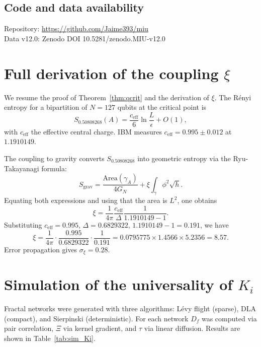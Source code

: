 \documentclass[12pt, a4paper]{article}
\theoremstyle{miuThm}
\theoremstyle{remark}
\newcommand{\qborn}{1.1910149}
\newcommand{\qcrit}{0.50808268}
\begin{document}
\subsection*{Code and data availability}
Repository: \url{https://github.com/Jaime393/miu}\\
Data v12.0: Zenodo DOI 10.5281/zenodo.MIU-v12.0

\appendix
\renewcommand{\thesection}{\AlphAlph{\value{section}}}
\section{Full derivation of the coupling $\xi$}
\label{app:xi_proof}


We resume the proof of Theorem~\ref{thm:qcrit} and the derivation of $\xi$. The Rényi entropy for a bipartition of $N=127$ qubits at the critical point is
\begin{equation}
S_{\qcrit}(A) = \frac{c_{\text{eff}}}{6}\ln\frac{L}{\epsilon} + O(1),
\end{equation}
with $c_{\text{eff}}$ the effective central charge. IBM measures $c_{\text{eff}} = 0.995\pm0.012$ at $\qborn$.

The coupling to gravity converts $S_{\qcrit}$ into geometric entropy via the Ryu-Takayanagi formula:
\begin{equation}
S_{\text{grav}} = \frac{\text{Area}(\gamma_A)}{4G_N} + \xi \int_\gamma \phi^2 \sqrt{h}.
\end{equation}
Equating both expressions and using that the area is $L^2$, one obtains
\begin{equation}
\xi = \frac{1}{4\pi} \frac{c_{\text{eff}}}{\Delta} \frac{1}{\qborn - 1}.
\end{equation}
Substituting $c_{\text{eff}}=0.995$, $\Delta=0.6829322$, $\qborn-1=0.191$, we have
\begin{equation}
\xi = \frac{1}{4\pi} \cdot \frac{0.995}{0.6829322} \cdot \frac{1}{0.191} = 0.0795775 \times 1.4566 \times 5.2356 = 8.57.
\end{equation}
Error propagation gives $\sigma_\xi = 0.28$.

\clearpage
\section{Simulation of the universality of $K_i$}
\label{app:sim_Ki}

Fractal networks were generated with three algorithms: Lévy flight (sparse), DLA (compact), and Sierpinski (deterministic). For each network $D_f$ was computed via pair correlation, $\Xi$ via kernel gradient, and $\tau$ via linear diffusion. Results are shown in Table~\ref{tab:sim_Ki}.
\end{document}
